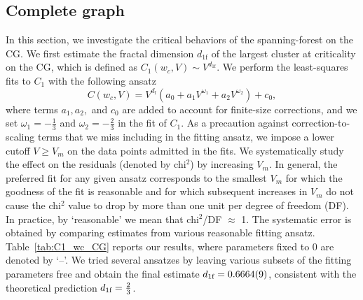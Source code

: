 \subsection{Complete graph}
In this section, we investigate the critical behaviors of the spanning-forest on the CG.
We first estimate the fractal dimension $d_{1 \textrm{f}}$ of the largest cluster at criticality on the CG, which is defined as $C_1(w_c, V) \sim V^{d_{1\textrm{f}}}$.
We perform the least-squares fits to $C_1$ with the following ansatz
\begin{equation}\label{eq:C1_ansatz_CG}
    C(w_c, V) = V^{d_{\textrm{f}}}(a_0 + a_1V^{\omega_1} +a_2 V^{\omega_2}) + c_0,
\end{equation}
where terms $a_1, a_2,$ and $c_0$ are added to account for finite-size corrections, and we set $\omega_1 = -\frac{1}{3}$ and $\omega_2 = -\frac{2}{3}$ in the fit of $C_1$.
As a precaution against correction-to-scaling terms that we miss including in the fitting ansatz, we impose a lower cutoff $V \geq V_m$ 
on the data points admitted in the fits. We systematically study the effect on the residuals (denoted by chi$^2$) by increasing $V_m$. In general, 
the preferred fit for any given ansatz corresponds to the smallest $V_m$ for which the goodness of the fit is reasonable and for which subsequent 
increases in $V_m$ do not cause the chi$^2$ value to drop by more than one unit per degree of freedom (DF). In practice, by `reasonable' 
we mean that chi$^2$/DF $\approx$ 1. The systematic error is obtained by comparing estimates from various reasonable fitting ansatz.
Table~\ref{tab:C1_wc_CG} reports our results, where parameters fixed to 0 are denoted by `--'. We tried several ansatzes by
leaving various subsets of the fitting parameters free and obtain the final estimate ${d_{1\textrm{f}}} = 0.6664(9)$, consistent with the theoretical 
prediction ${d_{1\textrm{f}}} = \frac{2}{3}$.


